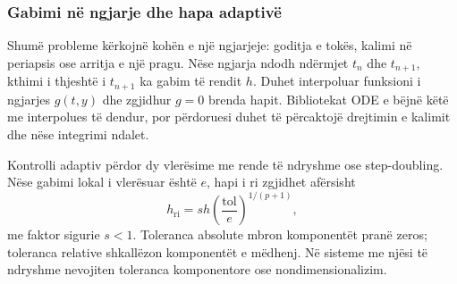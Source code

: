 \subsubsection{Gabimi në ngjarje dhe hapa adaptivë}
Shumë probleme kërkojnë kohën e një ngjarjeje: goditja e tokës, kalimi në periapsis ose arritja e një pragu. Nëse ngjarja ndodh ndërmjet $t_n$ dhe $t_{n+1}$, kthimi i thjeshtë i $t_{n+1}$ ka gabim të rendit $h$. Duhet interpoluar funksioni i ngjarjes $g(t,y)$ dhe zgjidhur $g=0$ brenda hapit. Bibliotekat ODE e bëjnë këtë me interpolues të dendur, por përdoruesi duhet të përcaktojë drejtimin e kalimit dhe nëse integrimi ndalet.

Kontrolli adaptiv përdor dy vlerësime me rende të ndryshme ose step-doubling. Nëse gabimi lokal i vlerësuar është $e$, hapi i ri zgjidhet afërsisht
\begin{equation}
 h_{\mathrm{ri}}=s h\left(\frac{\mathrm{tol}}{e}\right)^{1/(p+1)},
\end{equation}
me faktor sigurie $s<1$. Toleranca absolute mbron komponentët pranë zeros; toleranca relative shkallëzon komponentët e mëdhenj. Në sisteme me njësi të ndryshme nevojiten toleranca komponentore ose nondimensionalizim.

